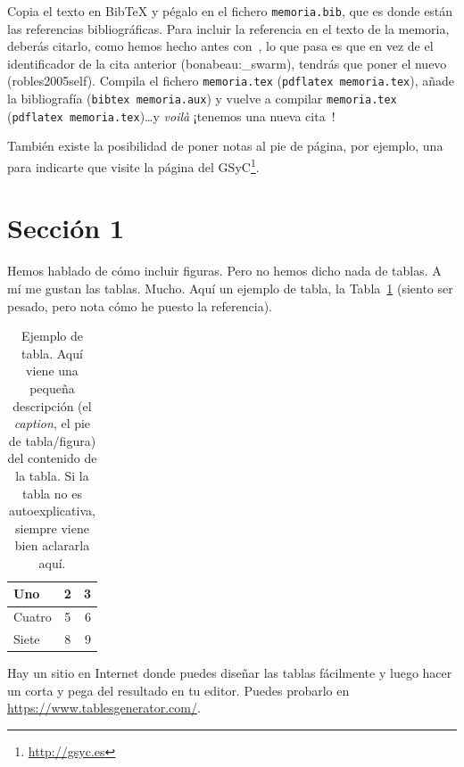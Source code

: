 Copia el texto en BibTeX y pégalo en el fichero \texttt{memoria.bib}, que es donde están las referencias bibliográficas.
Para incluir la referencia en el texto de la memoria, deberás citarlo, como hemos hecho antes con~\cite{bonabeau:_swarm}, lo que pasa es que en vez de el identificador de la cita anterior (bonabeau:\_swarm), tendrás que poner el nuevo (robles2005self).
Compila el fichero \texttt{memoria.tex} (\texttt{pdflatex memoria.tex}), añade la bibliografía (\texttt{bibtex memoria.aux}) y vuelve a compilar \texttt{memoria.tex} (\texttt{pdflatex memoria.tex})\ldots y \emph{voilà} ¡tenemos una nueva cita~\cite{robles2005self}!

También existe la posibilidad de poner notas al pie de página, por ejemplo, una para indicarte que visite la página del GSyC\footnote{\url{http://gsyc.es}}.



\section{Sección 1} 
\label{sec:seccion1}

Hemos hablado de cómo incluir figuras.
Pero no hemos dicho nada de tablas.
A mí me gustan las tablas.
Mucho.
Aquí un ejemplo de tabla, la Tabla~\ref{tab:ejemplo} (siento ser pesado, pero nota cómo he puesto la referencia).

\begin{table}
 \begin{center}
  \begin{tabular}{ | l | c | r |} %
    \hline
    Uno & 2 & 3 \\ \hline %
    Cuatro & 5 & 6 \\ \hline
    Siete & 8 & 9 \\
    \hline
  \end{tabular}
  \caption{Ejemplo de tabla. Aquí viene una pequeña descripción (el \emph{caption}, el pie de tabla/figura) del contenido de la tabla. Si la tabla no es autoexplicativa, siempre viene bien aclararla aquí.}
  \label{tab:ejemplo}
 \end{center}
\end{table}

Hay un sitio en Internet donde puedes diseñar las tablas fácilmente y luego hacer un corta y pega del resultado en tu editor.
Puedes probarlo en \url{https://www.tablesgenerator.com/}.




